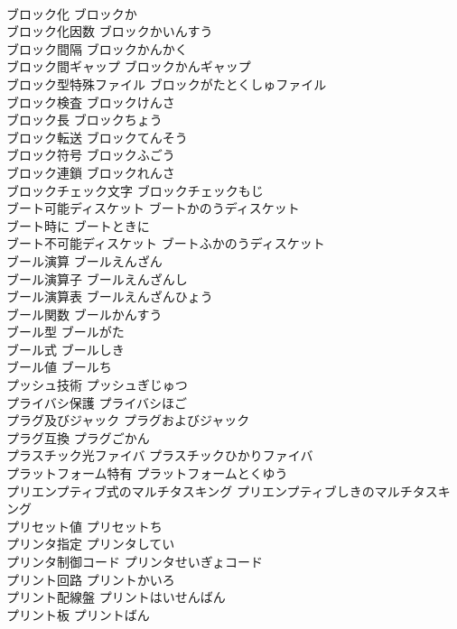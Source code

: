 \documentclass[8pt]{extreport}
\begin{document}
\begin{CJK}{UTF8}{min}
\\	ブロック化	ブロックか	
\\	ブロック化因数	ブロックかいんすう	
\\	ブロック間隔	ブロックかんかく	
\\	ブロック間ギャップ	ブロックかんギャップ	
\\	ブロック型特殊ファイル	ブロックがたとくしゅファイル	
\\	ブロック検査	ブロックけんさ	
\\	ブロック長	ブロックちょう	
\\	ブロック転送	ブロックてんそう	
\\	ブロック符号	ブロックふごう	
\\	ブロック連鎖	ブロックれんさ	
\\	ブロックチェック文字	ブロックチェックもじ	
\\	ブート可能ディスケット	ブートかのうディスケット	
\\	ブート時に	ブートときに	
\\	ブート不可能ディスケット	ブートふかのうディスケット	
\\	ブール演算	ブールえんざん	
\\	ブール演算子	ブールえんざんし	
\\	ブール演算表	ブールえんざんひょう	
\\	ブール関数	ブールかんすう	
\\	ブール型	ブールがた	
\\	ブール式	ブールしき	
\\	ブール値	ブールち	
\\	プッシュ技術	プッシュぎじゅつ	
\\	プライバシ保護	プライバシほご	
\\	プラグ及びジャック	プラグおよびジャック	
\\	プラグ互換	プラグごかん	
\\	プラスチック光ファイバ	プラスチックひかりファイバ	
\\	プラットフォーム特有	プラットフォームとくゆう	
\\	プリエンプティブ式のマルチタスキング	プリエンプティブしきのマルチタスキング	
\\	プリセット値	プリセットち	
\\	プリンタ指定	プリンタしてい	
\\	プリンタ制御コード	プリンタせいぎょコード	
\\	プリント回路	プリントかいろ	
\\	プリント配線盤	プリントはいせんばん	
\\	プリント板	プリントばん	

\end{CJK}
\end{document}
